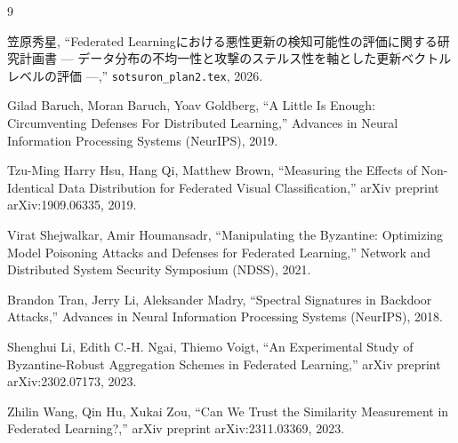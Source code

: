 \documentclass[a4j, twocolumn, dvipdfmx]{jsarticle}
\begin{document}
\begin{thebibliography}{9}

笠原秀星,
``Federated Learningにおける悪性更新の検知可能性の評価に関する研究計画書 --- データ分布の不均一性と攻撃のステルス性を軸とした更新ベクトルレベルの評価 ---,''
\texttt{sotsuron\_plan2.tex}, 2026.

Gilad Baruch, Moran Baruch, Yoav Goldberg,
``A Little Is Enough: Circumventing Defenses For Distributed Learning,''
Advances in Neural Information Processing Systems (NeurIPS), 2019.

Tzu-Ming Harry Hsu, Hang Qi, Matthew Brown,
``Measuring the Effects of Non-Identical Data Distribution for Federated Visual Classification,''
arXiv preprint arXiv:1909.06335, 2019.

Virat Shejwalkar, Amir Houmansadr,
``Manipulating the Byzantine: Optimizing Model Poisoning Attacks and Defenses for Federated Learning,''
Network and Distributed System Security Symposium (NDSS), 2021.

Brandon Tran, Jerry Li, Aleksander Madry,
``Spectral Signatures in Backdoor Attacks,''
Advances in Neural Information Processing Systems (NeurIPS), 2018.

Shenghui Li, Edith C.-H. Ngai, Thiemo Voigt,
``An Experimental Study of Byzantine-Robust Aggregation Schemes in Federated Learning,''
arXiv preprint arXiv:2302.07173, 2023.

Zhilin Wang, Qin Hu, Xukai Zou,
``Can We Trust the Similarity Measurement in Federated Learning?,''
arXiv preprint arXiv:2311.03369, 2023.

\end{thebibliography}
\end{document}
